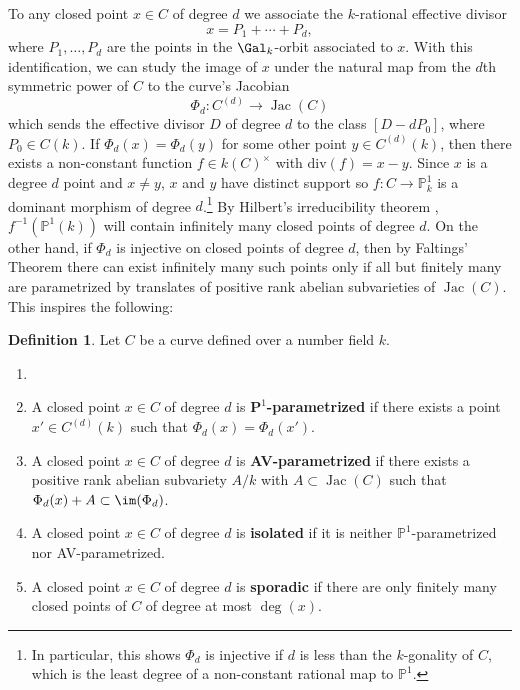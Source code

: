 \documentclass[11pt,reqno]{amsart}
\theoremstyle{plain}
\theoremstyle{definition}
\newtheorem{definition}[theorem]{Definition}
\newcommand{\PP}{\mathbf P}
\newcommand{\Jac}{\operatorname{Jac}}
\begin{document}
To any closed point $x \in C$ of degree $d$ we associate the $k$-rational effective divisor 
\[
 x=P_1+ \cdots +P_{d},
\]
where $P_1, \dots, P_{d}$ are the points in the $\Gal_{k}$-orbit associated to $x$. With this identification, we can study the image of $x$ under the natural map from the $d$th symmetric power of $C$ to the curve's Jacobian
\[
\Phi_d: C^{(d)} \rightarrow \Jac(C)
\]
which sends the effective divisor $D$ of degree $d$ to the class $[D - dP_0]$, where $P_0 \in C(k)$. If $\Phi_d(x)=\Phi_d(y)$ for some other point $y \in C^{(d)}(k)$, then there exists a non-constant function $f \in k(C)^{\times}$ with $\text{div}(f)=x-y$. Since $x$ is a degree $d$ point and $x\not=y$, $x$ and $y$ have distinct support so $f: C \rightarrow \mathbb{P}^1_{k}$ is a dominant morphism of degree $d$.\footnote{In particular, this shows $\Phi_d$ is injective if $d$ is less than the $k$-gonality of $C$, which is the least degree of a non-constant rational map to $\mathbb{P}^1$.} By Hilbert's irreducibility theorem \cite[Chapter 9]{serre97}, $f^{-1}(\mathbb{P}^{1}(k))$ will contain infinitely many closed points of degree $d$. On the other hand, if $\Phi_d$ is injective on closed points of degree $d$, then by Faltings' Theorem \cite{faltings} there can exist infinitely many such points only if all but finitely many are parametrized by translates of positive rank abelian subvarieties of $\Jac(C)$. This inspires the following:

\begin{definition} Let $C$ be a curve defined over a number field $k$.
\begin{enumerate}
\item []
\item A closed point $x \in C$ of degree $d$ is $\PP^1$\textbf{-parametrized} if there exists a point $x' \in C^{(d)}(k)$ such that $\Phi_d(x)=\Phi_d(x')$.
\item A closed point $x \in C$ of degree $d$ is \textbf{AV-parametrized} if there exists a positive rank abelian subvariety $A/k$ with  $A \subset \Jac(C)$ such that $\Phi_d(x)+A \subset \im(\Phi_d)$.
\item A closed point $x \in C$ of degree $d$ is \textbf{isolated} if it is neither $\mathbb{P}^1$-parametrized nor AV-parametrized.
\item A closed point $x \in C$ of degree $d$ is \textbf{sporadic} if there are only finitely many closed points of $C$ of degree at most $\deg(x)$.
\end{enumerate}
\end{definition}
\end{document}
